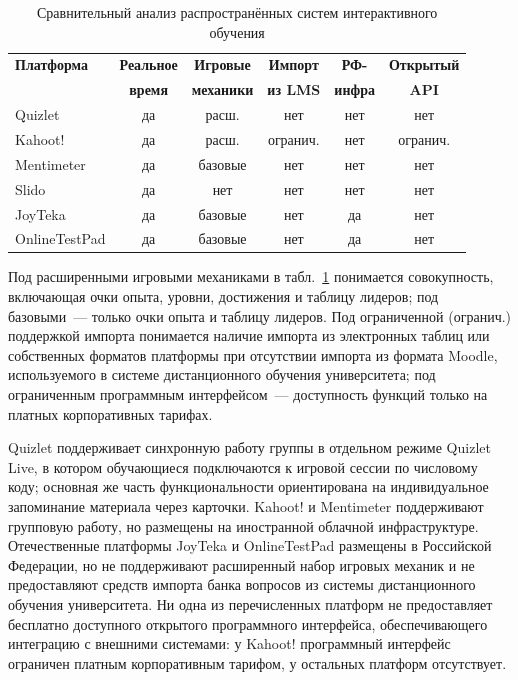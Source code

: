 \begin{table}[!htb]
\fontsize{11pt}{13pt}\selectfont
\centering
\caption{Сравнительный анализ распространённых систем интерактивного обучения}
\label{tab:competitors}
\smallskip
\begin{tabular}{|l|c|c|c|c|c|}
    \hline
    \textbf{Платформа} & \textbf{Реальное} & \textbf{Игровые} & \textbf{Импорт} & \textbf{РФ-} & \textbf{Открытый} \\
                       & \textbf{время}    & \textbf{механики} & \textbf{из LMS} & \textbf{инфра} & \textbf{API} \\
    \hline
        Quizlet         & да         & расш.    & нет       & нет & нет \\
    \hline
        Kahoot!         & да         & расш.    & огранич.  & нет & огранич. \\
    \hline
        Mentimeter      & да         & базовые  & нет       & нет & нет \\
    \hline
        Slido           & да         & нет      & нет       & нет & нет \\
    \hline
        JoyTeka         & да         & базовые  & нет       & да  & нет \\
    \hline
        OnlineTestPad   & да         & базовые  & нет       & да  & нет \\
    \hline
\end{tabular}
\end{table}

Под расширенными игровыми механиками в табл.~\ref{tab:competitors}
понимается совокупность, включающая очки опыта, уровни, достижения
и таблицу лидеров; под базовыми~--- только очки опыта и таблицу
лидеров. Под ограниченной (огранич.) поддержкой импорта понимается
наличие импорта из электронных таблиц или собственных форматов
платформы при отсутствии импорта из формата Moodle, используемого
в системе дистанционного обучения университета; под ограниченным
программным интерфейсом~--- доступность функций только на платных
корпоративных тарифах.

Quizlet поддерживает синхронную работу группы в отдельном режиме
Quizlet Live, в котором обучающиеся подключаются к игровой сессии
по числовому коду; основная же часть функциональности
ориентирована на индивидуальное запоминание материала через
карточки. Kahoot! и Mentimeter поддерживают групповую работу,
но размещены на иностранной облачной инфраструктуре. Отечественные
платформы JoyTeka и OnlineTestPad размещены в Российской Федерации,
но не поддерживают расширенный набор игровых механик и не
предоставляют средств импорта банка вопросов из системы
дистанционного обучения университета. Ни одна из перечисленных платформ
не предоставляет бесплатно доступного открытого программного
интерфейса, обеспечивающего интеграцию с внешними системами:
у Kahoot! программный интерфейс ограничен платным корпоративным
тарифом, у остальных платформ отсутствует.

